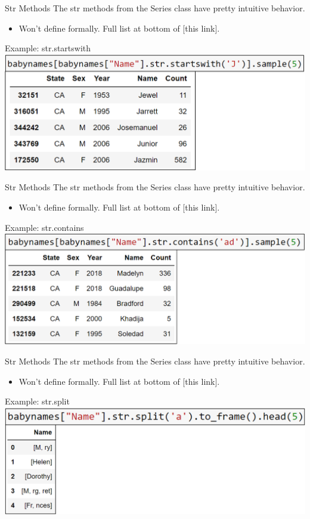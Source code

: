 \documentclass[aspectratio=169]{../latex_main/tntbeamer}  %
\begin{document}
	
	\begin{frame}[c]{Str Methods}
	    The str methods from the Series class have pretty intuitive behavior.
	    \begin{itemize}
	        \item Won’t define formally. Full list at bottom of [this link].
	    \end{itemize}
	    Example: str.startswith
	    \includegraphics[scale=.44]{Bild6}\\
	\end{frame}
	
	
	
	\begin{frame}[c]{Str Methods}
	    The str methods from the Series class have pretty intuitive behavior.
	    \begin{itemize}
	        \item Won’t define formally. Full list at bottom of [this link].
	    \end{itemize}
	    Example: str.contains
	    \includegraphics[scale=.44]{Bild7}\\
	\end{frame}
	
	
	
	\begin{frame}[c]{Str Methods}
	    The str methods from the Series class have pretty intuitive behavior.
	    \begin{itemize}
	        \item Won’t define formally. Full list at bottom of [this link].
	    \end{itemize}
	    Example: str.split
	    \includegraphics[scale=.44]{Bild8}\\
	\end{frame}
	
\end{document}
